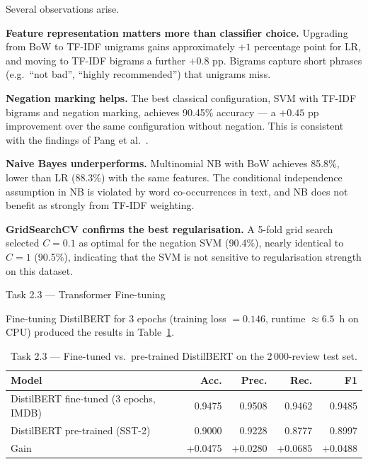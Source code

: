 \documentclass[12pt,reqno,twoside]{amsbook}
\makeatletter
\def\section{\@startsection{section}{1}%
      \z@{.5\linespacing\@plus.7\linespacing}{.25\linespacing}%
      {\normalfont\bfseries\flushleft}}
\theoremstyle{plain}
\numberwithin{equation}{chapter}
\numberwithin{section}{chapter}
\makeatother
\begin{document}
\noindent Several observations arise.

\textbf{Feature representation matters more than classifier choice.}
Upgrading from BoW to TF-IDF unigrams gains approximately $+1$ percentage point
for LR, and moving to TF-IDF bigrams a further $+0.8$ pp.
Bigrams capture short phrases (e.g.\ ``not bad'', ``highly recommended'') that
unigrams miss.

\textbf{Negation marking helps.}
The best classical configuration, SVM with TF-IDF bigrams and negation marking,
achieves 90.45\% accuracy --- a $+0.45$ pp improvement over the same configuration
without negation.
This is consistent with the findings of Pang et al.~\cite{pang2002}.

\textbf{Naive Bayes underperforms.}
Multinomial NB with BoW achieves 85.8\%, lower than LR (88.3\%) with the same
features.
The conditional independence assumption in NB is violated by word co-occurrences
in text, and NB does not benefit as strongly from TF-IDF weighting.

\textbf{GridSearchCV confirms the best regularisation.}
A 5-fold grid search selected $C=0.1$ as optimal for the negation SVM (90.4\%),
nearly identical to $C=1$ (90.5\%), indicating that the SVM is not sensitive to
regularisation strength on this dataset.

\section{Task 2.3 --- Transformer Fine-tuning}

\noindent Fine-tuning DistilBERT for 3 epochs (training loss $= 0.146$, runtime
$\approx 6.5$~h on CPU) produced the results in Table~\ref{tab:t23ft}.

\begin{table}[ht]
\centering
\caption{Task 2.3 --- Fine-tuned vs.\ pre-trained DistilBERT on the 2\,000-review
test set.}
\label{tab:t23ft}
\begin{tabular}{lrrrr}
\toprule
Model & Acc. & Prec. & Rec. & F1 \\
\midrule
DistilBERT fine-tuned (3 epochs, IMDB) & 0.9475 & 0.9508 & 0.9462 & 0.9485 \\
DistilBERT pre-trained (SST-2)         & 0.9000 & 0.9228 & 0.8777 & 0.8997 \\
\midrule
Gain                                   & +0.0475 & +0.0280 & +0.0685 & +0.0488 \\
\bottomrule
\end{tabular}
\end{table}
\end{document}
